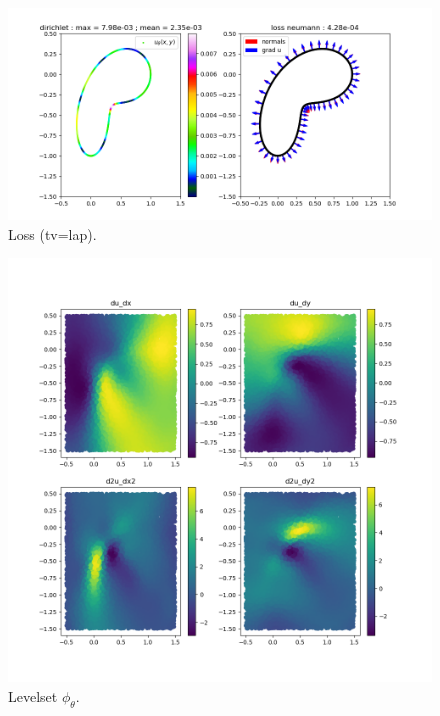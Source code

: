 \documentclass[french]{article}
\begin{document}
	\begin{minipage}{0.56\linewidth}
		\begin{figure}[H]
			\centering
			\includegraphics[width=\linewidth]{"levelset/bean/bc_bean.png"}
			\caption{Loss (tv=lap).}
		\end{figure}
	\end{minipage}
	\begin{minipage}{0.43\linewidth}
		\begin{figure}[H]
			\centering
			\includegraphics[width=\linewidth]{"levelset/bean/derivees_bean.png"}
			\caption{Levelset $\phi_\theta$.}
		\end{figure}
	\end{minipage}
\end{document}
